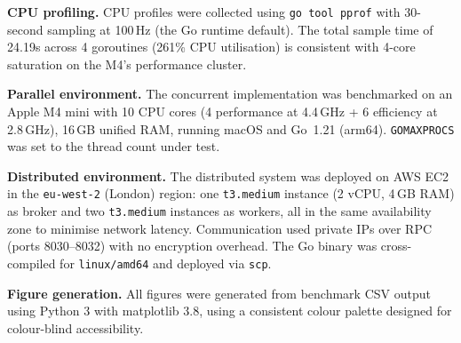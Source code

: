 \documentclass[10pt,twocolumn]{article}
\begin{document}
\textbf{CPU profiling.}
CPU profiles were collected using \texttt{go tool pprof} with 30-second sampling at 100\,Hz (the Go runtime default).
The total sample time of 24.19s across 4 goroutines (261\% CPU utilisation) is consistent with 4-core saturation on the M4's performance cluster.

\textbf{Parallel environment.}
The concurrent implementation was benchmarked on an Apple M4 mini with 10 CPU cores (4 performance at 4.4\,GHz + 6 efficiency at 2.8\,GHz), 16\,GB unified RAM, running macOS and Go~1.21 (arm64).
\texttt{GOMAXPROCS} was set to the thread count under test.

\textbf{Distributed environment.}
The distributed system was deployed on AWS EC2 in the \texttt{eu-west-2} (London) region: one \texttt{t3.medium} instance (2 vCPU, 4\,GB RAM) as broker and two \texttt{t3.medium} instances as workers, all in the same availability zone to minimise network latency.
Communication used private IPs over RPC (ports 8030--8032) with no encryption overhead.
The Go binary was cross-compiled for \texttt{linux/amd64} and deployed via \texttt{scp}.

\textbf{Figure generation.}
All figures were generated from benchmark CSV output using Python 3 with matplotlib 3.8, using a consistent colour palette designed for colour-blind accessibility.
\end{document}
